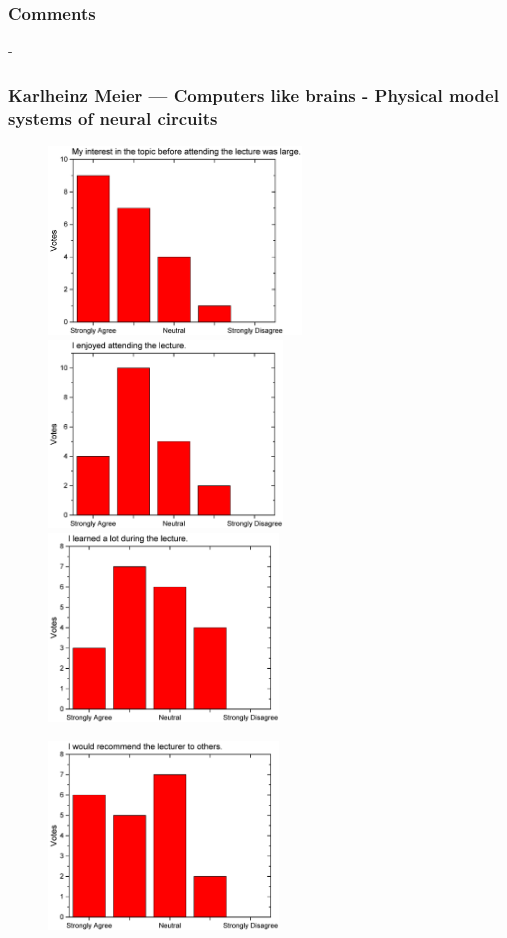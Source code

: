 \subsubsection*{Comments}
-
\newpage


\subsubsection{Karlheinz Meier  --- Computers like brains - Physical model systems of neural circuits}
\begin{figure}[h!]
  \centering
  \begin{minipage}{.48\linewidth}
    \centering
      {\includegraphics[height=50mm]{figures/n/Graph81.pdf}}
      {\includegraphics[height=50mm]{figures/n/Graph82.pdf}}
      {\includegraphics[height=50mm]{figures/n/Graph83.pdf}}
  \end{minipage}\quad
  \begin{minipage}{.48\linewidth}
    \centering
      {\includegraphics[height=50mm]{figures/n/Graph84.pdf}}

\end{minipage}
\end{figure}
